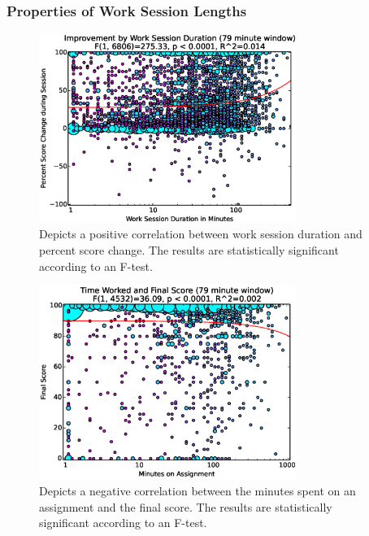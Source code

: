 \subsubsection{Properties of Work Session Lengths}

\begin{figure}[!t]
\centering \includegraphics[width=3.3in]{graphs/Improvement_by_Work_Session_Duration_(79_minute_window).eps}
\caption{Depicts a positive correlation between work session duration and
  percent score change. The results are statistically significant according to
  an F-test.}
\end{figure}

\begin{figure}[!t]
\centering \includegraphics[width=3.3in]{graphs/Time_Worked_and_Final_Score_(79_minute_window).eps}
\caption{Depicts a negative correlation between the minutes spent on an
  assignment and the final score. The results are statistically significant
  according to an F-test.}
\end{figure}

